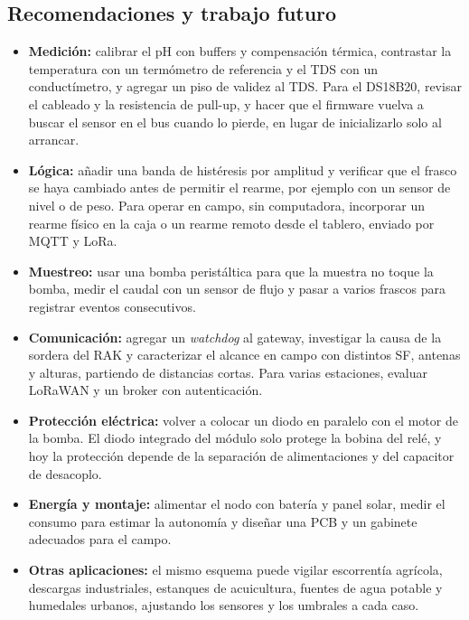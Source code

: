\subsection{Recomendaciones y trabajo futuro}
\label{sec:recomendaciones}

\begin{itemize}
    \item \textbf{Medición:} calibrar el pH con buffers y compensación térmica, contrastar la temperatura con un termómetro de referencia y el TDS con un conductímetro, y agregar un piso de validez al TDS. Para el DS18B20, revisar el cableado y la resistencia de pull-up, y hacer que el firmware vuelva a buscar el sensor en el bus cuando lo pierde, en lugar de inicializarlo solo al arrancar.
    \item \textbf{Lógica:} añadir una banda de histéresis por amplitud y verificar que el frasco se haya cambiado antes de permitir el rearme, por ejemplo con un sensor de nivel o de peso. Para operar en campo, sin computadora, incorporar un rearme físico en la caja o un rearme remoto desde el tablero, enviado por MQTT y LoRa.
    \item \textbf{Muestreo:} usar una bomba peristáltica para que la muestra no toque la bomba, medir el caudal con un sensor de flujo y pasar a varios frascos para registrar eventos consecutivos.
    \item \textbf{Comunicación:} agregar un \textit{watchdog} al gateway, investigar la causa de la sordera del RAK y caracterizar el alcance en campo con distintos SF, antenas y alturas, partiendo de distancias cortas. Para varias estaciones, evaluar LoRaWAN y un broker con autenticación.
    \item \textbf{Protección eléctrica:} volver a colocar un diodo en paralelo con el motor de la bomba. El diodo integrado del módulo solo protege la bobina del relé, y hoy la protección depende de la separación de alimentaciones y del capacitor de desacoplo.
    \item \textbf{Energía y montaje:} alimentar el nodo con batería y panel solar, medir el consumo para estimar la autonomía y diseñar una PCB y un gabinete adecuados para el campo.
    \item \textbf{Otras aplicaciones:} el mismo esquema puede vigilar escorrentía agrícola, descargas industriales, estanques de acuicultura, fuentes de agua potable y humedales urbanos, ajustando los sensores y los umbrales a cada caso.
\end{itemize}
